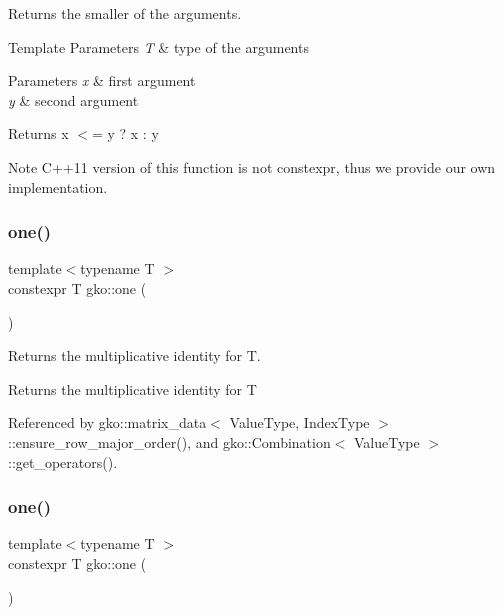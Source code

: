 Returns the smaller of the arguments. 


\begin{DoxyTemplParams}{Template Parameters}
{\em T} & type of the arguments\\
\hline
\end{DoxyTemplParams}

\begin{DoxyParams}{Parameters}
{\em x} & first argument \\
\hline
{\em y} & second argument\\
\hline
\end{DoxyParams}
\begin{DoxyReturn}{Returns}
x $<$= y ? x \+: y
\end{DoxyReturn}
\begin{DoxyNote}{Note}
C++11 version of this function is not {\ttfamily constexpr}, thus we provide our own implementation. 
\end{DoxyNote}
\mbox{\label{namespacegko_a0059e27f8f4bc348ff65c1e60caf47c8}} 
\subsubsection{\texorpdfstring{one()}{one()}\hspace{0.1cm}{\footnotesize\ttfamily [1/2]}}
{\footnotesize\ttfamily template$<$typename T $>$ \\
constexpr T gko\+::one (\begin{DoxyParamCaption}{ }\end{DoxyParamCaption})\hspace{0.3cm}{\ttfamily [inline]}}



Returns the multiplicative identity for T. 

\begin{DoxyReturn}{Returns}
the multiplicative identity for T 
\end{DoxyReturn}


Referenced by gko\+::matrix\+\_\+data$<$ Value\+Type, Index\+Type $>$\+::ensure\+\_\+row\+\_\+major\+\_\+order(), and gko\+::\+Combination$<$ Value\+Type $>$\+::get\+\_\+operators().

\mbox{\label{namespacegko_ab4f16ecf0a759f46259cf9518f1e4568}} 
\subsubsection{\texorpdfstring{one()}{one()}\hspace{0.1cm}{\footnotesize\ttfamily [2/2]}}
{\footnotesize\ttfamily template$<$typename T $>$ \\
constexpr T gko\+::one (\begin{DoxyParamCaption}\item[{const T \&}]{ }\end{DoxyParamCaption})\hspace{0.3cm}{\ttfamily [inline]}}




